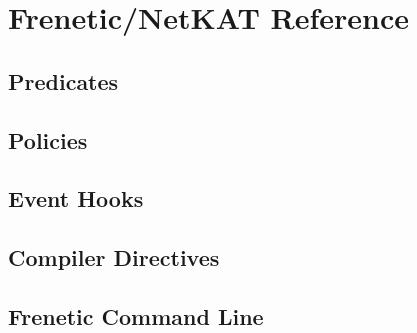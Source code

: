 \chapter{Frenetic/NetKAT Reference}

\section{Predicates}
 \label{netkat_reference:predicates}

\section{Policies}

\section{Event Hooks}

\section{Compiler Directives}

\section{Frenetic Command Line}

